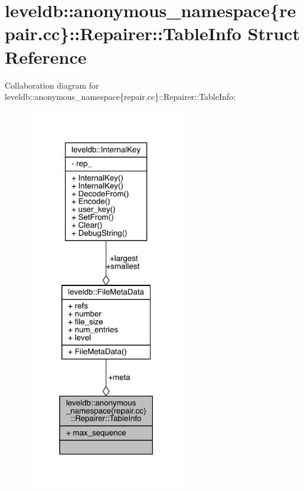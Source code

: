 \hypertarget{structleveldb_1_1anonymous__namespace_02repair_8cc_03_1_1_repairer_1_1_table_info}{}\section{leveldb\+:\+:anonymous\+\_\+namespace\{repair.\+cc\}\+:\+:Repairer\+:\+:Table\+Info Struct Reference}
\label{structleveldb_1_1anonymous__namespace_02repair_8cc_03_1_1_repairer_1_1_table_info}


Collaboration diagram for leveldb\+:\+:anonymous\+\_\+namespace\{repair.\+cc\}\+:\+:Repairer\+:\+:Table\+Info\+:
\nopagebreak
\begin{figure}[H]
\begin{center}
\leavevmode
\includegraphics[width=198pt]{structleveldb_1_1anonymous__namespace_02repair_8cc_03_1_1_repairer_1_1_table_info__coll__graph}
\end{center}
\end{figure}
